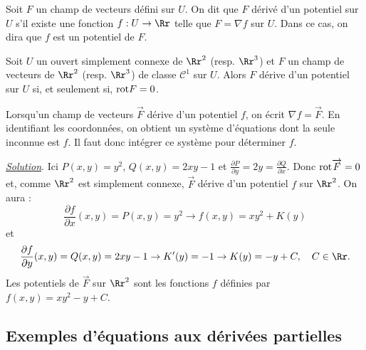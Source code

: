\documentclass[11pt, class=report,crop=false]{standalone}
\begin{document}
\vskip6mm

\begin{definition}Soit $F$ un champ de vecteurs défini sur $U$. On dit que $F$ dérivé d'un potentiel sur $U$ s'il existe une fonction $f:U\to \Rr$ telle que $F= \nabla f$ sur $U$. Dans ce cas, on dira que $f$ est un potentiel de $F$.
\end{definition}

\vskip4mm

\begin{theoreme}[\bf Poincaré]Soit $U$ un ouvert simplement connexe de $\Rr^2$ (resp. $\Rr^3$) et $F$ un champ de vecteurs de $\Rr^2$ (resp. $\Rr^3$) de classe ${\mathscr C}^1$ sur $U$. Alors $F$ dérive d'un potentiel sur $U$ si, et seulement si, $\mathrm{rot} F=0$.
\end{theoreme}

\vskip6mm

Lorsqu'un champ de vecteurs $\overrightarrow{F}$ dérive d'un potentiel $f$, on écrit $\displaystyle \nabla f=\overrightarrow{F}$. En identifiant les coordonnées, on obtient un système d'équations dont la seule inconnue est $f$. Il faut donc intégrer ce système pour déterminer $f$.

\vskip6mm


\vskip4mm

\noindent \underline{\it Solution}. \rm Ici $P(x,y)=y^2$, $Q(x,y)=2xy-1$ et $\displaystyle \frac{\partial P}{\partial y}=2y=\frac{\partial Q}{\partial x}$. Donc $\mathrm{rot} \overrightarrow{F}=0$ et, comme $\Rr^2$ est simplement connexe, $\overrightarrow{F}$ dérive d'un potentiel $f$ sur $\Rr^2$. On aura :
$$\frac{\partial f}{\partial x}(x,y)=P(x,y)=y^2\rightarrow f(x,y)=xy^2+K(y)$$
et 
$$\frac{\partial f}{\partial y}(x,y)=Q(x,y)=2xy-1\rightarrow K'(y)=-1\rightarrow K(y)=-y+C,\quad C\in \Rr.$$
Les potentiels de $\overrightarrow{F}$ sur $\Rr^2$ sont les fonctions $f$ définies par $f(x,y)=xy^2-y+C$.

\vskip8mm

\subsection{Exemples d'équations aux dérivées partielles}

\vskip4mm
\end{document}

